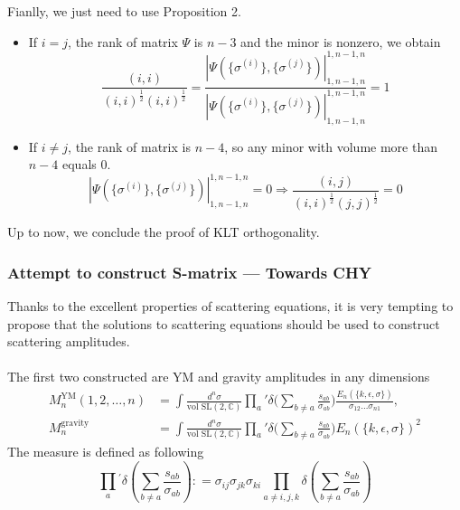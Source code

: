 \documentclass{beamer}
\begin{document}
\begin{frame}
    Fianlly, we just need to use Proposition 2. 
    \begin{itemize}
        \item If $i=j$, the rank of matrix $\Psi$ is $n-3$ and the minor is nonzero, we obtain
        \begin{equation*}
            \frac{(i,i)}{(i,i)^{\frac12}(i,i)^{\frac12}}=\frac{|\Psi(\{\sigma^{(i)}\},\{\sigma^{(j)}\})|_{1,n-1,n}^{1,n-1,n}}{|\Psi(\{\sigma^{(i)}\},\{\sigma^{(j)}\})|_{1,n-1,n}^{1,n-1,n}}=1
        \end{equation*}
        \item If $i\neq j$, the rank of matrix is $n-4$, so any minor with volume more than $n-4$ equals 0.
        \begin{equation*}
            |\Psi(\{\sigma^{(i)}\},\{\sigma^{(j)}\})|_{1,n-1,n}^{1,n-1,n}=0\Rightarrow \frac{(i,j)}{(i,i)^{\frac12}(j,j)^{\frac12}}=0
        \end{equation*}
    \end{itemize}
    Up to now, we conclude the proof of KLT orthogonality.
\end{frame}
\begin{frame}
    \frametitle{Attempt to construct S-matrix --- Towards CHY}
    Thanks to the excellent properties of scattering equations, it is very tempting to propose that the solutions
    to scattering equations should be used to construct scattering amplitudes.
    \\ \hspace*{\fill}\\
    The first two constructed are YM and gravity amplitudes in any dimensions
    \begin{align*}
        M_n^{\mathrm{YM}}(1,2,\dots,n)&=\int\frac{d^n\sigma}{\text{vol SL}(2,\mathbb{C})}\prod_a{'}\delta\bigg(\sum_{b\neq a}\frac{s_{ab}}{\sigma_{ab}}\bigg)\frac{E_n(\{k,\epsilon,\sigma\})}{\sigma_{12}\dots\sigma_{n1}},\\
        M_n^{\mathrm{gravity}}&=\int\frac{d^n\sigma}{\text{vol SL}(2,\mathbb{C})}\prod_a{'}\delta\bigg(\sum_{b\neq a}\frac{s_{ab}}{\sigma_{ab}}\bigg)E_n(\{k,\epsilon,\sigma\})^2
    \end{align*}
    The measure is defined as following
    \begin{equation*}
        \prod_{a}{}^{\prime}\delta{\left(\sum_{b\neq a}\frac{s_{ab}}{\sigma_{ab}}\right)}{:}=\sigma_{ij}\sigma_{jk}\sigma_{ki}\prod_{a\neq i,j,k}\delta{\left(\sum_{b\neq a}\frac{s_{ab}}{\sigma_{ab}}\right)}
    \end{equation*}
\end{frame}
\end{document}
